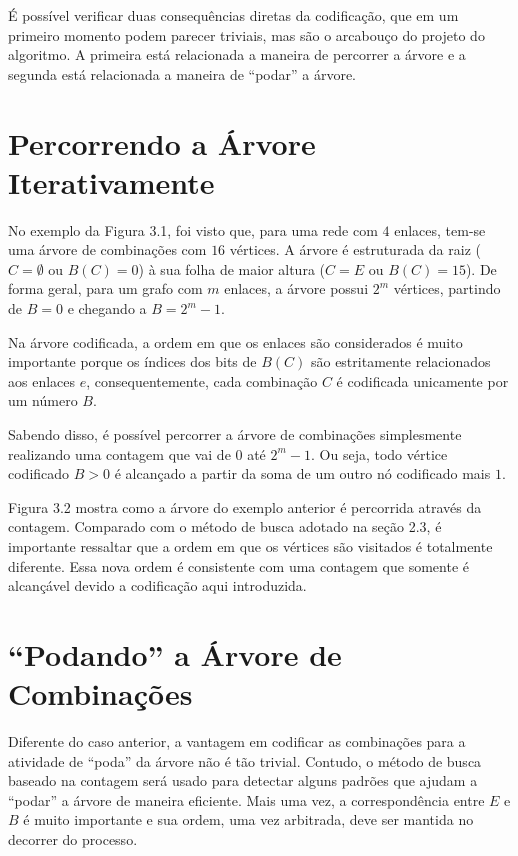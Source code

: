 É possível verificar duas consequências diretas da codificação, que em um primeiro momento podem parecer triviais, mas são o arcabouço do projeto do algoritmo. A primeira está relacionada a maneira de percorrer a árvore e a segunda está relacionada a maneira de ``podar'' a árvore.

\section{Percorrendo a Árvore Iterativamente}

No exemplo da Figura 3.1, foi visto que, para uma rede com $4$ enlaces, tem-se uma árvore de combinações com $16$ vértices. A árvore é estruturada da raiz ($C=\emptyset$ ou $B(C)=0$) à sua folha de maior altura ($C=E$ ou $B(C)=15$). De forma geral, para um grafo com $m$ enlaces, a árvore possui $2^m$ vértices, partindo de $B=0$ e chegando a $B=2^m-1$.

Na árvore codificada, a ordem em que os enlaces são considerados é muito importante porque os índices dos bits de $B(C)$ são estritamente relacionados aos enlaces $e$, consequentemente, cada combinação $C$ é codificada unicamente por um número $B$.

Sabendo disso, é possível percorrer a árvore de combinações simplesmente realizando uma contagem que vai de $0$ até $2^m -1$. Ou seja, todo vértice codificado $B>0$ é alcançado a partir da soma de um outro nó codificado mais $1$.


Figura 3.2 mostra como a árvore do exemplo anterior é percorrida através da contagem. Comparado com o método de busca adotado na seção 2.3, é importante ressaltar que a ordem em que os vértices são visitados é totalmente diferente. Essa nova ordem é consistente com uma contagem que somente é alcançável devido a codificação aqui introduzida.

\section{“Podando” a Árvore de Combinações}

Diferente do caso anterior, a vantagem em codificar as combinações para a atividade de ``poda'' da árvore não é tão trivial. Contudo, o método de busca baseado na contagem será usado para detectar alguns padrões que ajudam a “podar” a árvore de maneira eficiente. Mais uma vez, a correspondência entre $E$ e $B$ é muito importante e sua ordem, uma vez arbitrada, deve ser mantida no decorrer do processo. 

